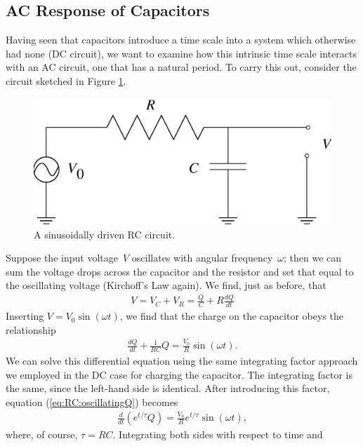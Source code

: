\subsection{AC Response of Capacitors}

Having seen that capacitors introduce a time scale into a system which 
otherwise had none (DC circuit), we want to examine how this intrinsic time
scale interacts with an AC circuit, one that has a natural period. To carry
this out, consider the circuit sketched in Figure 
\ref{fig:RC:driven rc circuit}. 
\begin{figure}[htb]
\centering 
\epsfxsize=8cm \includegraphics[scale=0.5]{5_rccircuits/rc2.eps}
\caption{A sinusoidally driven RC circuit.}
\label{fig:RC:driven rc circuit}
\end{figure}
Suppose the input voltage~$V$ oscillates with angular frequency~$\omega$; then
we can sum the voltage drops across the capacitor and the resistor and set that
equal to the oscillating voltage (Kirchoff's Law again). We find, just as 
before, that
\begin{eqnarray*}
V = V_C + V_R = \frac{Q}{C}+R\frac{dQ}{dt}
\end{eqnarray*}
Inserting $V = V_0 \sin (\omega t)$, we find that the charge on the capacitor 
obeys the relationship
\begin{eqnarray}
\frac{dQ}{dt} + \frac{1}{RC} Q = \frac{V_0}{R} \sin (\omega t).
   \label{eq:RC:oscillatingQ}
\end{eqnarray}
We can solve this differential equation using the same integrating factor
approach we employed in the DC case for charging the capacitor. The integrating
factor is the same, since the left-hand side is identical. After introducing 
this factor, equation (\ref{eq:RC:oscillatingQ}) becomes
\begin{eqnarray*}
\frac{d}{dt} \left( e^{t/\tau} Q \right) = \frac{V_0}{R} e^{t/\tau} \sin
(\omega t),
\end{eqnarray*}
where, of course, $\tau=RC$. Integrating both sides with respect to time and 
